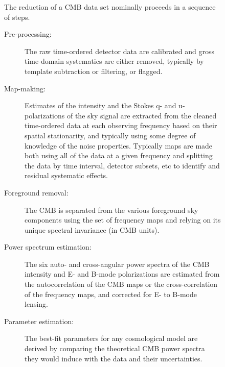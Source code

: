 \begin{figure}[htbp]
\begin{minipage}[h]{0.6\linewidth}
The reduction of a CMB data set nominally proceeds in a sequence of steps.
\begin{description}
\item[ Pre-processing:] The raw time-ordered detector data are calibrated and gross time-domain systematics are either removed, typically by template subtraction or filtering, or flagged.
\item[Map-making:] Estimates of the intensity and the Stokes q- and u-polarizations of the sky signal are extracted from the cleaned time-ordered data at each observing frequency based on their spatial stationarity, and typically using some degree of knowledge of the noise properties. Typically maps are made both using all of the data at a given frequency and splitting the data by time interval, detector subsets, etc to identify and residual systematic effects.
\item[Foreground removal:] The CMB is separated from the various foreground sky components using the set of frequency maps and relying on its unique spectral invariance (in CMB units).
\item[Power spectrum estimation:] The six auto- and cross-angular power spectra of the CMB intensity and E- and B-mode polarizations are estimated from the autocorrelation of the CMB maps or the cross-correlation of the frequency maps, and corrected for E- to B-mode lensing.
\item[Parameter estimation:] The best-fit parameters for any cosmological model are derived by comparing the theoretical CMB power spectra they would induce with the data and their uncertainties.
\end{description}
\end{minipage}
\begin{minipage}[h]{0.4\linewidth}
\begin{center}

\end{center}
\end{minipage}
\end{figure}
